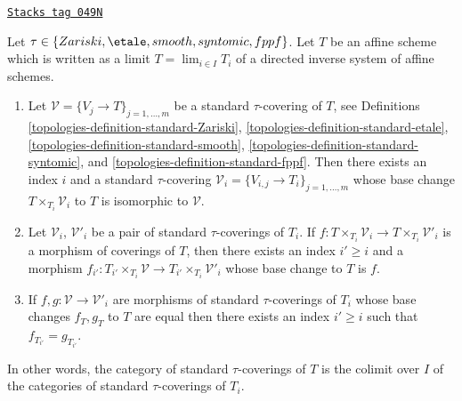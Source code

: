 \begin{lemma}
\label{topologies-lemma-limit-fppf-topology}
\href{https://stacks.math.columbia.edu/tag/049N}{\texttt{Stacks tag 049N}}

Let $\tau \in \{Zariski, \etale, smooth, syntomic, fppf\}$.
Let $T$ be an affine scheme which is written as a limit
$T = \lim_{i \in I} T_i$ of a directed inverse system of affine schemes.
\begin{enumerate}
\item Let $\mathcal{V} = \{V_j \to T\}_{j = 1, \ldots, m}$ be a
standard $\tau$-covering of $T$, see Definitions
\ref{topologies-definition-standard-Zariski},
\ref{topologies-definition-standard-etale},
\ref{topologies-definition-standard-smooth},
\ref{topologies-definition-standard-syntomic}, and
\ref{topologies-definition-standard-fppf}.
Then there exists an index $i$ and a standard $\tau$-covering
$\mathcal{V}_i = \{V_{i, j} \to T_i\}_{j = 1, \ldots, m}$
whose base change $T \times_{T_i} \mathcal{V}_i$ to $T$
is isomorphic to $\mathcal{V}$.
\item Let $\mathcal{V}_i$, $\mathcal{V}'_i$ be a pair of standard
$\tau$-coverings of $T_i$. If
$f : T \times_{T_i} \mathcal{V}_i \to T \times_{T_i} \mathcal{V}'_i$ is
a morphism of coverings of $T$, then there exists an index
$i' \geq i$ and a morphism
$f_{i'} : T_{i'} \times_{T_i} \mathcal{V} \to
T_{i'} \times_{T_i} \mathcal{V}'_i$
whose base change to $T$ is $f$.
\item If
$f, g : \mathcal{V} \to \mathcal{V}'_i$
are morphisms of standard $\tau$-coverings of $T_i$ whose
base changes $f_T, g_T$ to $T$ are equal then there exists an
index $i' \geq i$ such that $f_{T_{i'}} = g_{T_{i'}}$.
\end{enumerate}
In other words, the category of standard $\tau$-coverings of $T$ is
the colimit over $I$ of the categories of standard $\tau$-coverings of $T_i$.
\end{lemma}

